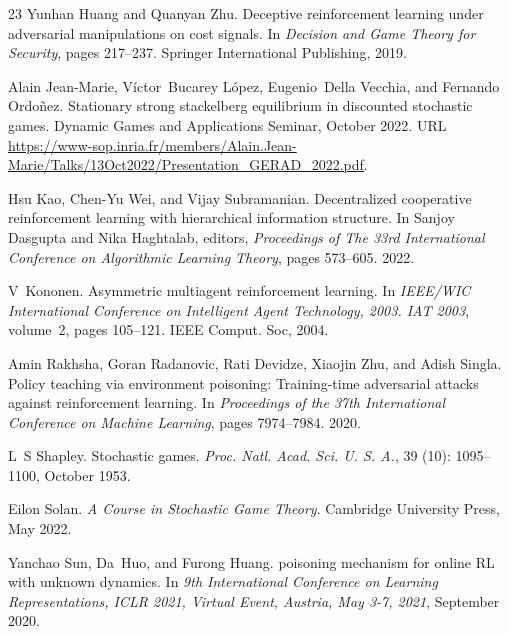 \documentclass{acml}
\begin{document}
\begin{thebibliography}{23}
Yunhan Huang and Quanyan Zhu.
\newblock Deceptive reinforcement learning under adversarial manipulations on cost signals.
\newblock In \emph{Decision and Game Theory for Security}, pages 217--237. Springer International Publishing, 2019.

Alain Jean-Marie, Víctor~Bucarey López, Eugenio~Della Vecchia, and Fernando Ordoñez.
\newblock Stationary strong stackelberg equilibrium in discounted stochastic games.
\newblock Dynamic Games and Applications Seminar, October 2022.
\newblock URL \url{https://www-sop.inria.fr/members/Alain.Jean-Marie/Talks/13Oct2022/Presentation_GERAD_2022.pdf}.

Hsu Kao, Chen-Yu Wei, and Vijay Subramanian.
\newblock Decentralized cooperative reinforcement learning with hierarchical information structure.
\newblock In Sanjoy Dasgupta and Nika Haghtalab, editors, \emph{Proceedings of The 33rd International Conference on Algorithmic Learning Theory}, pages 573--605. 2022.

V~Kononen.
\newblock Asymmetric multiagent reinforcement learning.
\newblock In \emph{{IEEE/WIC} International Conference on Intelligent Agent Technology, 2003. {IAT} 2003}, volume~2, pages 105--121. IEEE Comput. Soc, 2004.

Amin Rakhsha, Goran Radanovic, Rati Devidze, Xiaojin Zhu, and Adish Singla.
\newblock Policy teaching via environment poisoning: Training-time adversarial attacks against reinforcement learning.
\newblock In \emph{Proceedings of the 37th International Conference on Machine Learning}, pages 7974--7984. 2020.

L~S Shapley.
\newblock Stochastic games.
\newblock \emph{Proc. Natl. Acad. Sci. U. S. A.}, 39 (10): 1095--1100, October 1953.

Eilon Solan.
\newblock \emph{A Course in Stochastic Game Theory}.
\newblock Cambridge University Press, May 2022.

Yanchao Sun, Da~Huo, and Furong Huang.
 poisoning mechanism for online {RL} with unknown dynamics.
\newblock In \emph{9th International Conference on Learning Representations, {ICLR} 2021, Virtual Event, Austria, May 3-7, 2021}, September 2020.


\end{thebibliography}
\end{document}
